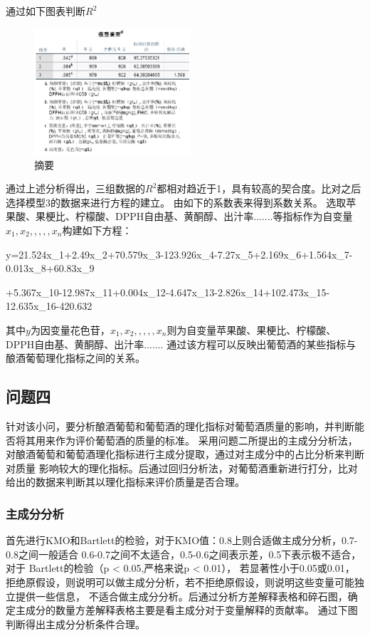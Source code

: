 \documentclass[UTF8]{ctexart}
\begin{document}
								通过如下图表判断${R^2}$
							\begin{figure}[H]\centering
								\includegraphics[width=0.52\textwidth,height=0.45\textwidth]{img/摘要表.png} %
								\caption{摘要} %
								\label{fig:figure 7} %
								\end{figure}
								通过上述分析得出，三组数据的${R^2}$都相对趋近于1，具有较高的契合度。比对之后选择模型3的数据来进行方程的建立。
								由如下的系数表来得到系数关系。
								选取苹果酸、果梗比、柠檬酸、DPPH自由基、黄酮醇、出汁率.......等指标作为自变量${x_1,x_2,,,,,x_n}$构建如下方程：

								y=21.524{x_1}+2.49{x_2}+70.579{x_3}-123.926{x_4}-7.27{x_5}+2.169{x_6}+1.564{x_7}-0.013{x_8}+60.83{x_9}
								
								+5.367{x_{10}}-12.987{x_{11}}+0.004{x_{12}}-4.647{x_{13}}-2.826{x_{14}}+102.473{x_{15}}-12.635{x_{16}}-420.632
		
								其中$y$为因变量花色苷，${x_1,x_2,,,,,x_n}$则为自变量苹果酸、果梗比、柠檬酸、DPPH自由基、黄酮醇、出汁率.......
								通过该方程可以反映出葡萄酒的某些指标与酿酒葡萄理化指标之间的关系。



								\subsection{问题四}
								针对该小问，要分析酿酒葡萄和葡萄酒的理化指标对葡萄酒质量的影响，并判断能否将其用来作为评价葡萄酒的质量的标准。
								采用问题二所提出的主成分分析法，对酿酒葡萄和葡萄酒理化指标进行主成分提取，通过对主成分中的占比分析来判断对质量
								影响较大的理化指标。后通过回归分析法，对葡萄酒重新进行打分，比对给出的数据来判断其以理化指标来评价质量是否合理。
								\subsubsection{主成分分析}
								首先进行KMO和Bartlett的检验，对于KMO值：0.8上则合适做主成分分析，0.7-0.8之间一般适合
								0.6-0.7之间不太适合，0.5-0.6之间表示差，0.5下表示极不适合，对于 Bartlett的检验（p < 0.05,严格来说p < 0.01），
								若显著性小于0.05或0.01，拒绝原假设，则说明可以做主成分分析，若不拒绝原假设，则说明这些变量可能独立提供一些信息，
								不适合做主成分分析。后通过分析方差解释表格和碎石图，确定主成分的数量方差解释表格主要是看主成分对于变量解释的贡献率。
								通过下图判断得出主成分分析条件合理。
\end{document}

